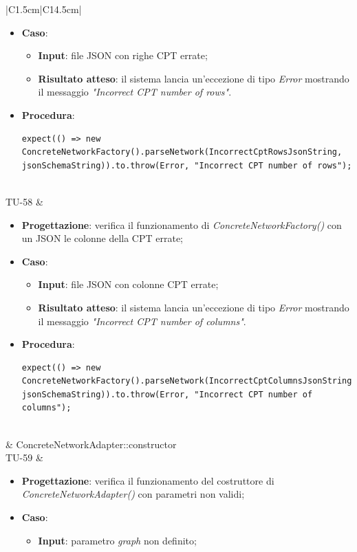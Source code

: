 \begin{longtable}{|C{1.5cm}|C{14.5cm}|}
\begin{itemize}
		\item \textbf{Caso}: 
		\begin{itemize}
			\item \textbf{Input}: file JSON con righe CPT errate;
			\item \textbf{Risultato atteso}: il sistema lancia un'eccezione di tipo \emph{Error} mostrando il messaggio \emph{"Incorrect CPT number of rows"}.
		\end{itemize}
		\item \textbf{Procedura}:
		\begin{lstlisting}
expect(() => new ConcreteNetworkFactory().parseNetwork(IncorrectCptRowsJsonString, jsonSchemaString)).to.throw(Error, "Incorrect CPT number of rows");
		\end{lstlisting}
	\end{itemize}\\
	\hline
		{TU-58} &
	\begin{itemize}
		\item \textbf{Progettazione}: verifica il funzionamento di \emph{ConcreteNetworkFactory()} con un JSON le colonne della CPT errate;
		\item \textbf{Caso}: 
		\begin{itemize}
			\item \textbf{Input}: file JSON con colonne CPT errate;
			\item \textbf{Risultato atteso}: il sistema lancia un'eccezione di tipo \emph{Error} mostrando il messaggio \emph{"Incorrect CPT number of columns"}.
		\end{itemize}
		\item \textbf{Procedura}:
		\begin{lstlisting}
expect(() => new ConcreteNetworkFactory().parseNetwork(IncorrectCptColumnsJsonString, jsonSchemaString)).to.throw(Error, "Incorrect CPT number of columns");
		\end{lstlisting}
	\end{itemize}\\
	\hline
{} & ConcreteNetworkAdapter::constructor
 \\ \hline
	{TU-59} &
	\begin{itemize}
		\item \textbf{Progettazione}: verifica il funzionamento del costruttore di \emph{ConcreteNetworkAdapter()} con parametri non validi;
		\item \textbf{Caso}: 
		\begin{itemize}
			\item \textbf{Input}: parametro \emph{graph} non definito;

\end{itemize}
\end{itemize}
\end{longtable}
